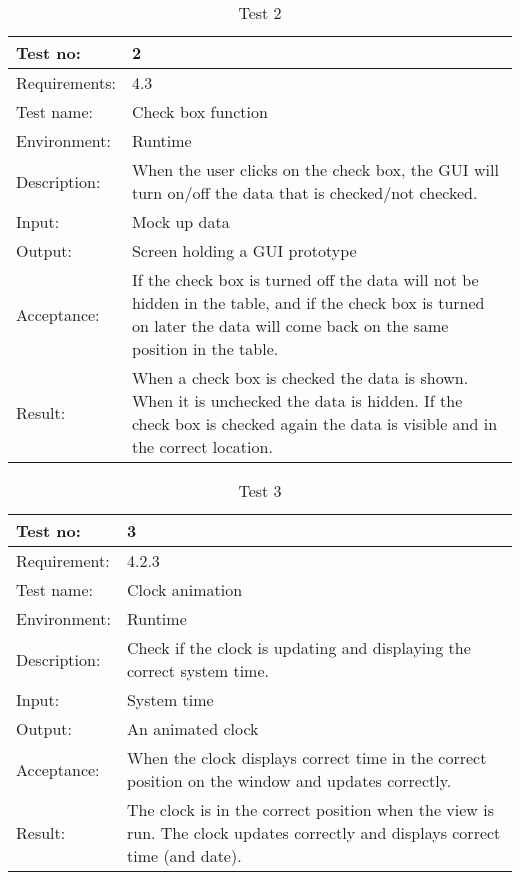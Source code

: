 \documentclass[../document.tex]{subfiles}
\begin{document}
\begin{table}[H]
\caption{Test 2}
\begin{tabularx}{\textwidth}{|l|X|}
\hline
Test no:
&2
\\ \hline Requirements:
&4.3
\\ \hline Test name:
&Check box function
\\ \hline Environment:
&Runtime
\\ \hline Description:
&When the user clicks on the check box, the GUI will turn on/off the data that is checked/not checked.
\\ \hline Input:
&Mock up data
\\ \hline Output:
&Screen holding a GUI prototype
\\ \hline Acceptance:
&If the check box is turned off the data will not be hidden in the table, and if the check box is turned on later the data will come back on the same position in the table.
\\ \hline Result:
&When a check box is checked the data is shown. When it is unchecked the data is hidden. If the check box is checked again the data is visible and in the correct location.
\\ \hline
\end{tabularx}
\end{table}

\begin{table}[H]
\caption{Test 3}
\begin{tabularx}{\textwidth}{|l|X|}
\hline
Test no:
&3
\\ \hline Requirement:
&4.2.3
\\ \hline Test name:
&Clock animation
\\ \hline Environment:
&Runtime
\\ \hline Description:
&Check if the clock is updating and displaying the correct system time.
\\ \hline Input:
&System time
\\ \hline Output:
&An animated clock
\\ \hline Acceptance:
&When the clock displays correct time in the correct position on the window and updates correctly.
\\ \hline Result:
&The clock is in the correct position when the view is run. The clock updates correctly and displays correct time (and date).
\\ \hline
\end{tabularx}
\end{table}
\end{document}

